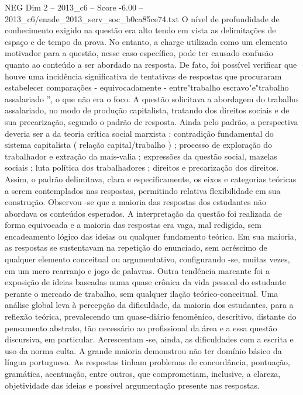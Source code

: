 \begin{textsample}{NEG Dim 2 – 2013\_c6 – Score -6.00 – 2013\_c6/enade\_2013\_serv\_soc\_b0ca85ce74.txt}
O nível de profundidade de conhecimento exigido na questão era alto tendo em vista as delimitações de espaço e de tempo da prova.
No entanto, a charge utilizada como um elemento motivador para a questão, nesse caso específico, pode ter causado confusão quanto ao conteúdo a ser abordado na resposta.
De fato, foi possível verificar que houve uma incidência significativa de tentativas de respostas que procuraram estabelecer comparações - equivocadamente - entre"trabalho escravo"e"trabalho assalariado ”, o que não era o foco.
A questão solicitava a abordagem do trabalho assalariado, no modo de produção capitalista, tratando dos direitos sociais e de sua precarização, segundo o padrão de resposta.
Ainda pelo padrão, a perspectiva deveria ser a da teoria crítica social marxista : contradição fundamental do sistema capitalista ( relação capital/trabalho ) ; processo de exploração do trabalhador e extração da mais-valia ; expressões da questão social, mazelas sociais ; luta política dos trabalhadores ; direitos e precarização dos direitos.
Assim, o padrão delimitava, clara e especificamente, os eixos e categorias teóricas a serem contemplados nas respostas, permitindo relativa flexibilidade em sua construção.
Observou -se que a maioria das respostas dos estudantes não abordava os conteúdos esperados.
A interpretação da questão foi realizada de forma equivocada e a maioria das respostas era vaga, mal redigida, sem encadeamento lógico das ideias ou qualquer fundamento teórico.
Em sua maioria, as respostas se sustentavam na repetição do enunciado, sem acréscimo de qualquer elemento conceitual ou argumentativo, configurando -se, muitas vezes, em um mero rearranjo e jogo de palavras.
Outra tendência marcante foi a exposição de ideias baseadas numa quase crônica da vida pessoal do estudante perante o mercado de trabalho, sem qualquer ilação teórico-conceitual.
Uma análise global leva à percepção da dificuldade, da maioria dos estudantes, para a reflexão teórica, prevalecendo um quase-diário fenomênico, descritivo, distante do pensamento abstrato, tão necessário ao profissional da área e a essa questão discursiva, em particular.
Acrescentam -se, ainda, as dificuldades com a escrita e uso da norma culta.
A grande maioria demonstrou não ter domínio básico da língua portuguesa.
As respostas tinham problemas de concordância, pontuação, gramática, acentuação, entre outros, que comprometiam, inclusive, a clareza, objetividade das ideias e possível argumentação presente nas respostas.

\end{textsample}
